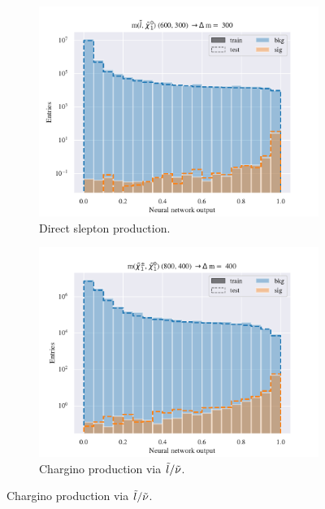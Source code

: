\begin{figure}[H]
    \centering
    \begin{subfigure}[t!]{0.49\textwidth}
        \includegraphics[width = \textwidth]{Figures/SlepSlep/ML/NN/High_level/Inter/scaled_train_test_396014.pdf}
        \caption{Direct slepton production.}
        \label{fig:SlepslepNNLow}
    \end{subfigure}
    \begin{subfigure}[t!]{0.49\textwidth}
        \includegraphics[width = \textwidth]{Figures/SlepSnu/NN/High_level/Inter/scaled_train_test_397150.pdf}
        \caption{Chargino production via $\Tilde{l}/\Tilde{\nu}$.}
        \label{fig:SlepsnuNNLow}
    \end{subfigure}    

\end{figure}
